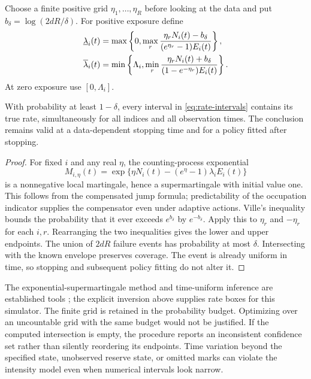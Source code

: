 Choose a finite positive grid $\eta_1,\ldots,\eta_R$ before looking at the data and put $b_\delta=\log(2dR/\delta)$. For positive exposure define
\begin{align}\label{eq:rate-intervals}
 \underline\lambda_i(t)
 &=\max\left\{0,\max_r
 \frac{\eta_rN_i(t)-b_\delta}{(e^{\eta_r}-1)E_i(t)}\right\},\\
 \overline\lambda_i(t)
 &=\min\left\{\Lambda_i,\min_r
 \frac{\eta_rN_i(t)+b_\delta}{(1-e^{-\eta_r})E_i(t)}\right\}.\notag
\end{align}
At zero exposure use $[0,\Lambda_i]$.

\begin{theorem}\label{thm:rate-confidence}
With probability at least $1-\delta$, every interval in \eqref{eq:rate-intervals} contains its true rate, simultaneously for all indices and all observation times. The conclusion remains valid at a data-dependent stopping time and for a policy fitted after stopping.
\end{theorem}
\begin{proof}
For fixed $i$ and any real $\eta$, the counting-process exponential
\[
 M_{i,\eta}(t)=\exp\{\eta N_i(t)-(e^\eta-1)\lambda_iE_i(t)\}
\]
is a nonnegative local martingale, hence a supermartingale with initial value one. This follows from the compensated jump formula; predictability of the occupation indicator supplies the compensator even under adaptive actions. Ville's inequality bounds the probability that it ever exceeds $e^{b_\delta}$ by $e^{-b_\delta}$. Apply this to $\eta_r$ and $-\eta_r$ for each $i,r$. Rearranging the two inequalities gives the lower and upper endpoints. The union of $2dR$ failure events has probability at most $\delta$. Intersecting with the known envelope preserves coverage. The event is already uniform in time, so stopping and subsequent policy fitting do not alter it.
\end{proof}

The exponential-supermartingale method and time-uniform inference are established tools \citep{howard2020}; the explicit inversion above supplies rate boxes for this simulator. The finite grid is retained in the probability budget. Optimizing over an uncountable grid with the same budget would not be justified. If the computed intersection is empty, the procedure reports an inconsistent confidence set rather than silently reordering its endpoints. Time variation beyond the specified state, unobserved reserve state, or omitted marks can violate the intensity model even when numerical intervals look narrow.

